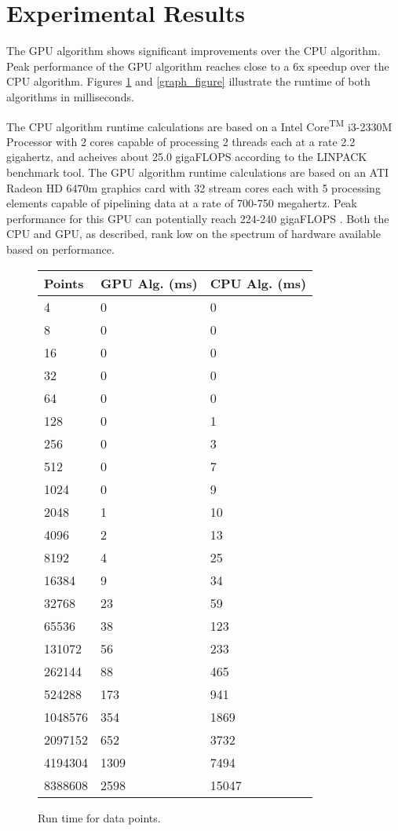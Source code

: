 \documentclass{article}
\begin{document}
\section{Experimental Results}

The GPU algorithm shows significant improvements over the CPU algorithm. Peak performance of the GPU algorithm reaches close to a 6x speedup over the CPU algorithm. Figures \ref{chart_figure} and \ref{graph_figure} illustrate the runtime of both algorithms in milliseconds.

The CPU algorithm runtime calculations are based on a Intel \textsuperscript{\textregistered} Core\textsuperscript{TM} i3-2330M Processor with 2 cores capable of processing 2 threads each at a rate 2.2 gigahertz, and acheives about 25.0 gigaFLOPS according to the LINPACK benchmark tool. The GPU algorithm runtime calculations are based on an ATI Radeon HD 6470m graphics card with 32 stream cores each with 5 processing elements capable of pipelining data at a rate of 700-750 megahertz. Peak performance for this GPU can potentially reach 224-240 gigaFLOPS \cite{amdspecs}. Both the CPU and GPU, as described, rank low on the spectrum of hardware available based on performance.

\begin{figure}
\centering
\begin{tabular}{|l|l|l|}
    \hline
    Points & GPU Alg. (ms) & CPU Alg. (ms) \\ \hline
    4 & 0 & 0 \\ 
    8 & 0 & 0 \\ 
    16 & 0 & 0 \\ 
    32 & 0 & 0 \\ 
    64 & 0 & 0 \\ 
    128 & 0 & 1 \\ 
    256 & 0 & 3 \\ 
    512 & 0 & 7 \\ 
    1024 & 0 & 9 \\ 
    2048 & 1 & 10 \\ 
    4096 & 2 & 13 \\ 
    8192 & 4 & 25 \\ 
    16384 & 9 & 34 \\ 
    32768 & 23 & 59 \\ 
    65536 & 38 & 123 \\
    131072 & 56 & 233 \\ 
    262144 & 88 & 465 \\ 
    524288 & 173 & 941 \\
    1048576 & 354 & 1869 \\ 
    2097152 & 652 & 3732 \\ 
    4194304 & 1309 & 7494 \\ 
    8388608 & 2598 & 15047 \\
    \hline
  \end{tabular}
\caption{Run time for  data points.}
\label{chart_figure}
\end{figure}
\end{document}
